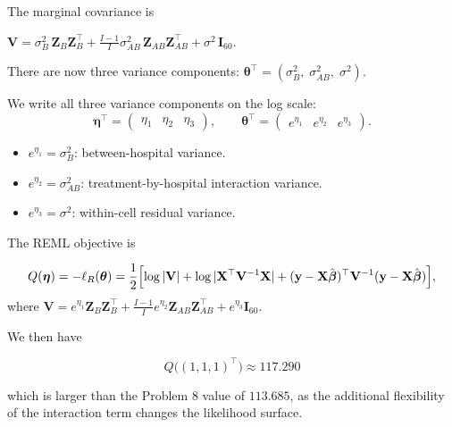 \documentclass[letterpaper]{article}
\begin{document}
	The marginal covariance is
	
	$
	\mathbf{V} = \sigma^2_B\,\mathbf{Z}_B\mathbf{Z}_B^\top
	+ \tfrac{I-1}{I}\sigma^2_{AB}\,\mathbf{Z}_{AB}\mathbf{Z}_{AB}^\top
	+ \sigma^2\,\mathbf{I}_{60}.
	$
	
	There are now three variance components:
	$\boldsymbol{\theta}^\top = (\sigma^2_B,\;\sigma^2_{AB},\;\sigma^2)$.
	
	
	
	We write all three variance components on the log scale:
	\[
	\boldsymbol{\eta}^\top = \begin{pmatrix} \eta_1 & \eta_2 & \eta_3 \end{pmatrix},
	\qquad
	\boldsymbol{\theta}^\top = \begin{pmatrix} e^{\eta_1} & e^{\eta_2} & e^{\eta_3} \end{pmatrix}.
	\]
	
	\begin{itemize}
		\item $e^{\eta_1} = \sigma^2_B$: between-hospital variance.
		\item $e^{\eta_2} = \sigma^2_{AB}$: treatment-by-hospital interaction variance.
		\item $e^{\eta_3} = \sigma^2$: within-cell residual variance.
	\end{itemize}
	
	The {REML objective} is
	
	\[
	Q(\boldsymbol{\eta}) = -\ell_R(\boldsymbol{\theta})
	= \frac{1}{2}\Bigl[
	\log|\mathbf{V}|
	+ \log|\mathbf{X}^\top\mathbf{V}^{-1}\mathbf{X}|
	+ (\mathbf{y}-\mathbf{X}\hat{\boldsymbol{\beta}})^\top
	\mathbf{V}^{-1}(\mathbf{y}-\mathbf{X}\hat{\boldsymbol{\beta}})
	\Bigr],
	\]
	where $\mathbf{V} = e^{\eta_1}\mathbf{Z}_B\mathbf{Z}_B^\top
	+ \tfrac{I-1}{I}e^{\eta_2}\mathbf{Z}_{AB}\mathbf{Z}_{AB}^\top
	+ e^{\eta_3}\mathbf{I}_{60}$.
	
	We then have
	
	\[
	{Q\bigl((1,1,1)^\top\bigr) \approx 117.290}
	\]
	
	which is larger than the Problem 8 value of $113.685$, as the
	additional flexibility of the interaction term changes the likelihood surface.
	
\end{document}
